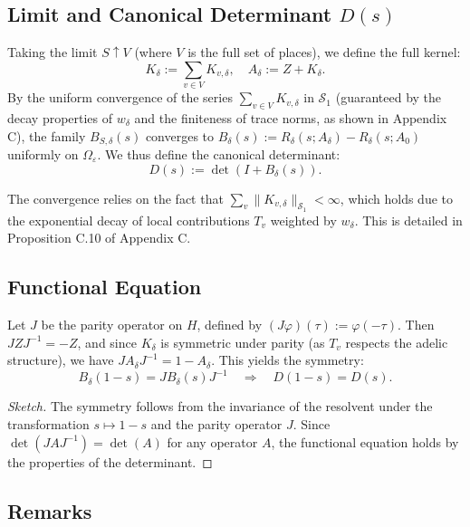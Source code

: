 \subsection{Limit and Canonical Determinant \( D(s) \)}

Taking the limit \( S \uparrow V \) (where \( V \) is the full set of places), we define the full kernel:
\[
K_\delta := \sum_{v \in V} K_{v,\delta}, \quad A_\delta := Z + K_\delta.
\]
By the uniform convergence of the series \( \sum_{v \in V} K_{v,\delta} \) in \( \mathcal{S}_1 \) (guaranteed by the decay properties of \( w_\delta \) and the finiteness of trace norms, as shown in Appendix C), the family \( B_{S,\delta}(s) \) converges to \( B_\delta(s) := R_\delta(s; A_\delta) - R_\delta(s; A_0) \) uniformly on \( \Omega_\varepsilon \). We thus define the canonical determinant:
\[
D(s) := \det \left( I + B_\delta(s) \right).
\]

\begin{remark}
The convergence relies on the fact that \( \sum_{v} \| K_{v,\delta} \|_{\mathcal{S}_1} < \infty \), which holds due to the exponential decay of local contributions \( T_v \) weighted by \( w_\delta \). This is detailed in Proposition C.10 of Appendix C.
\end{remark}

\subsection{Functional Equation}

Let \( J \) be the parity operator on \( H \), defined by \( (J\varphi)(\tau) := \varphi(-\tau) \). Then \( J Z J^{-1} = -Z \), and since \( K_\delta \) is symmetric under parity (as \( T_v \) respects the adelic structure), we have \( J A_\delta J^{-1} = 1 - A_\delta \). This yields the symmetry:
\[
B_\delta(1 - s) = J B_\delta(s) J^{-1} \quad \Rightarrow \quad D(1 - s) = D(s).
\]

\begin{proof}[Sketch]
The symmetry follows from the invariance of the resolvent under the transformation \( s \mapsto 1 - s \) and the parity operator \( J \). Since \( \det(J A J^{-1}) = \det(A) \) for any operator \( A \), the functional equation holds by the properties of the determinant.
\end{proof}

\subsection{Remarks}

